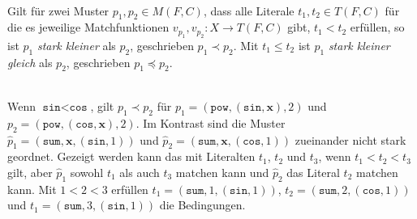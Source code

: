\begin{definition}~\\
Gilt für zwei Muster $p_1, p_2 \in M(F, C)$, dass alle Literale $t_1, t_2 \in T(F, C)$ für die es jeweilige Matchfunktionen $v_{p_1}, v_{p_2} \colon X \rightarrow T(F, C)$ gibt, $t_1 < t_2$ erfüllen, so ist $p_1$ \emph{stark kleiner} als $p_2$, geschrieben $p_1 \prec p_2$. Mit  $t_1 \leq t_2$ ist $p_1$ \emph{stark kleiner gleich} als $p_2$, geschrieben $p_1 \preceq p_2$.
\end{definition}

\begin{beispiel}~\\
Wenn $\texttt{sin} < \texttt{cos}$, gilt $p_1 \prec p_2$ für $p_1 = (\texttt{pow}, (\texttt{sin}, \mathbf x), 2)$ und $p_2 = (\texttt{pow}, (\texttt{cos}, \mathbf x), 2)$. Im Kontrast sind die Muster $\hat p_1 = (\texttt{sum}, \mathbf x, (\texttt{sin}, 1))$ und $\hat p_2 = (\texttt{sum}, \mathbf x, (\texttt{cos}, 1))$ zueinander nicht stark geordnet. Gezeigt werden kann das mit Literalten $t_1$, $t_2$ und $t_3$, wenn ${t_1 < t_2 < t_3}$ gilt, aber $\hat p_1$ sowohl $t_1$ als auch $t_3$ matchen kann und $\hat p_2$ das Literal $t_2$ matchen kann. Mit $1 < 2 < 3$ erfüllen $t_1 = (\texttt{sum}, 1, (\texttt{sin}, 1))$, $t_2 = (\texttt{sum}, 2, (\texttt{cos}, 1))$ und $t_1 = (\texttt{sum}, 3, (\texttt{sin}, 1))$ die Bedingungen.
\end{beispiel}


